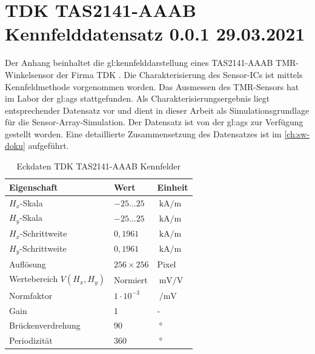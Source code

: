 %

\chapter{TDK TAS2141-AAAB Kennfelddatensatz 0.0.1 29.03.2021}\label{ch:tdk-datensatz}

Der Anhang beinhaltet die \gls{gl:kennfeld}darstellung eines TAS2141-AAAB TMR-Winkelsensor der Firma TDK \cite{TDK2016}. Die Charakterisierung des Sensor-ICs ist mittels Kennfeldmethode \cite{Schuethe2019} vorgenommen worden. Das Ausmessen des TMR-Sensors hat im Labor der \gls{gl:ags} stattgefunden. Als Charakterisierungsergebnis liegt entsprechender Datensatz vor und dient in dieser Arbeit als Simulationsgrundlage für die Sensor-Array-Simulation. Der Datensatz ist von der \gls{gl:ags} zur Verfügung gestellt worden. Eine detaillierte Zusammensetzung des Datensatzes ist im \autoref{ch:sw-doku} aufgeführt.


\vspace{5mm}
\begin{table}[!htbp]
	\centering
	\begin{tabular}{l l l}
		\toprule
		\textbf{Eigenschaft}      & \textbf{Wert}    & \textbf{Einheit} \\
		\midrule
		$H_x$-Skala               & $-25 \ldots 25$  & $\SI{}{\kilo\ampere\per\metre}$ \\
		$H_y$-Skala               & $-25 \ldots 25$  & $\SI{}{\kilo\ampere\per\metre}$ \\
		\hline
		$H_x$-Schrittweite        & $0,1961$         & $\SI{}{\kilo\ampere\per\metre}$ \\
		$H_y$-Schrittweite        & $0,1961$         & $\SI{}{\kilo\ampere\per\metre}$ \\
		\hline
		Auflösung                 & $256 \times 256$ & Pixel \\
		Wertebereich $V(H_x,H_y)$ & Normiert         & $\SI{}{\milli\volt\per\volt}$ \\
		\hline
		Normfaktor                & $1\cdot 10^{-3}$ & $\SI{}{\per\milli\volt}$ \\
		Gain                      & 1                & - \\
		\hline
		Brückenverdrehung         & 90               & $\SI{}{\degree}$ \\
		Periodizität              & 360              & $\SI{}{\degree}$ \\
		\bottomrule		
	\end{tabular}%
	\caption[Eckdaten TDK TAS2141-AAAB Kennfelder]{Eckdaten TDK TAS2141-AAAB Kennfelder}
\label{tab:tdk-char-data}
\end{table}


